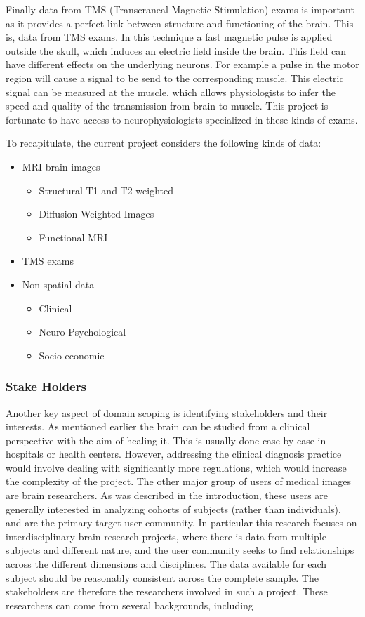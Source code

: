 Finally data from TMS (Transcraneal Magnetic Stimulation) exams \autocite{nollet_transcranial_2003} is important as it provides a perfect link between structure and functioning of the brain. This is, data from TMS exams. In this technique a fast magnetic pulse is applied outside the skull, which induces an electric field inside the brain. This field can have different effects on the underlying neurons. For example a pulse in the motor region will cause a signal to be send to the corresponding muscle. This electric signal can be measured at the muscle, which allows physiologists to infer the speed and quality of the transmission from brain to muscle. This project is fortunate to have access to neurophysiologists specialized in these kinds of exams. 

To recapitulate, the current project considers the following kinds of data:

\begin{itemize}
\item MRI brain images
\begin{itemize}
\item Structural T1 and T2 weighted
\item Diffusion Weighted Images
\item Functional MRI
\end{itemize}
\item TMS exams
\item Non-spatial data
\begin{itemize}
\item Clinical 
\item Neuro-Psychological 
\item Socio-economic 
\end{itemize}
\end{itemize}  

\subsubsection{Stake Holders}

Another key aspect of domain scoping is identifying stakeholders and their interests. As mentioned earlier the brain can be studied from a clinical perspective with the aim of healing it. This is usually done case by case in hospitals or health centers. However, addressing the clinical diagnosis practice would involve dealing with significantly more regulations, which would increase the complexity of the project. The other major group of users of medical images are brain researchers. As was described in the introduction, these users are generally interested in analyzing cohorts of subjects (rather than individuals), and are the primary target user community. In particular this research focuses on interdisciplinary brain research projects, where there is data from multiple subjects and different nature, and the user community seeks to find relationships across the different dimensions and disciplines. The data available for each subject should be reasonably consistent across the complete sample. The stakeholders are therefore the researchers involved in such a project. These researchers can come from several backgrounds, including

